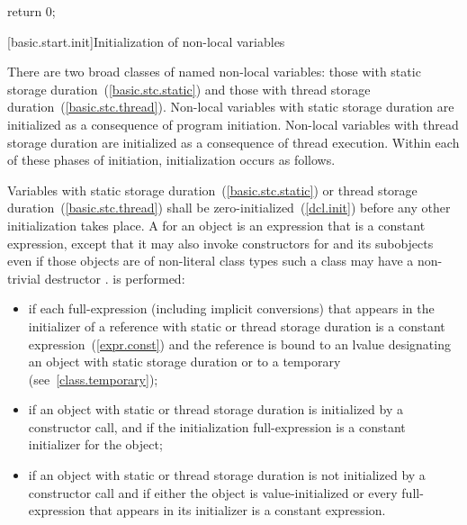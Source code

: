 \begin{codeblock}
return 0;
\end{codeblock}

[basic.start.init]{Initialization of non-local variables}

\pnum
{}%
%
There are two broad classes of named non-local variables: those with static storage
duration~(\ref{basic.stc.static}) and those with thread storage
duration~(\ref{basic.stc.thread}). Non-local variables with static storage duration
are initialized as a consequence of program initiation. Non-local variables with
thread storage duration are initialized as a consequence of thread execution.
Within each of these phases of initiation, initialization occurs as follows.

\pnum
{}%
%
%
%
%
Variables with static storage duration~(\ref{basic.stc.static}) or thread storage
duration~(\ref{basic.stc.thread}) shall be zero-initialized~(\ref{dcl.init}) before
any other initialization takes place.
A  for an object  is an expression that is a
constant expression, except that it may also invoke  constructors
for  and its subobjects even if those objects are of non-literal class
types \enternote such a class may have a non-trivial destructor \exitnote.
%
 is performed:

\begin{itemize}
\item
if each full-expression (including implicit conversions) that appears in
the initializer of a reference with static or thread storage duration is a
constant expression~(\ref{expr.const}) and the reference is bound to an lvalue
designating an object with static storage duration or to a temporary (see~\ref{class.temporary});

\item
if an object with static or thread storage duration is initialized
by a constructor call, and if the initialization full-expression is a constant
initializer for the object;

\item
if an object with static or thread storage duration is not initialized by a constructor call
and if either the object is value-initialized or every full-expression that
appears in its initializer is a constant expression.

\end{itemize}

